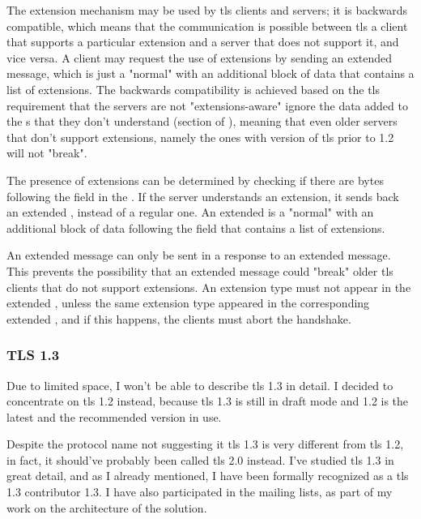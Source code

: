 \documentclass{llncs}
\begin{document}
The extension mechanism may be used by \gls{tls} clients and servers; it is backwards
compatible, which means that the communication is possible between \gls{tls} a
client that supports a particular extension and a server that does not support it,
and vice versa. A client may request the use of extensions by sending an extended 
message, which is just a "normal"  with an additional
block of data that contains a list of extensions. The backwards compatibility is achieved based on the \gls{tls}
requirement that the servers are not "extensions-aware" ignore the data
added to the s that they don't understand (section  of \cite{RFC2246}),
meaning that even older servers that don't support extensions, namely the ones with
version of \gls{tls} prior to 1.2 will not "break".

The presence of extensions can be determined by checking if there are bytes
following the  field in the .
If the server understands an extension, it sends back an extended ,
instead of a regular one. An extended  is a "normal"
 with an additional block of data following the
 field that contains a list of extensions.

An extended  message can only be sent in a response to an
extended  message. This prevents the possibility that an extended
 message could "break" older \gls{tls} clients that do not
support extensions. An extension type must not appear in the
extended , unless the same extension type appeared in the
corresponding extended , and if this happens, the clients must abort the handshake.

\subsubsection{TLS 1.3}

Due to limited space, I won't be able to describe \gls{tls} 1.3 in detail. I decided
to concentrate on \gls{tls} 1.2 instead, because \gls{tls} 1.3 is still in draft
mode and 1.2 is the latest and the recommended version in use.

Despite the protocol name not suggesting it \gls{tls} 1.3 is
very different from \gls{tls} 1.2, in fact, it should've probably been called
\gls{tls} 2.0 instead. I've studied \gls{tls} 1.3 in great detail, and as I already mentioned,
I have been formally recognized as a \gls{tls} 1.3 contributor 1.3.
I have also participated in the mailing lists, as part of my work on the architecture of the solution.
\end{document}
